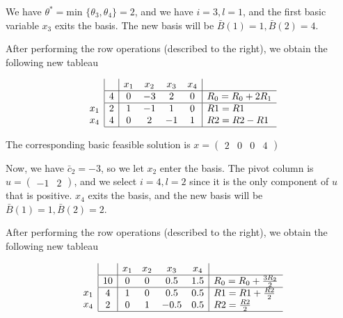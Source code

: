 \documentclass[11pt,a4paper]{article}
\begin{document}
We have $\theta^*=\text{min }\{\theta_3, \theta_4\}=2$, and we have $i=3, l=1$, and the first basic variable $x_3$ exits the basis. The new basis will be $\bar{B}(1)=1, \bar{B}(2)=4$.

After performing the row operations (described to the right), we obtain the following new tableau

$$
\begin{array}{c}
\\
 \\
x_1 \\
x_4 \\ 
\end{array}
\begin{array}{|c|cccc|l}
    & x_1 & x_2 & x_3 & x_4 & \\ \hline
  4 & 0 & -3 & 2 & 0 & R_0=R_0+2R_1 \\  \hline
  2 & 1 & -1 & 1 & 0 & R1=R1\\
  4 & 0 & 2 & -1 & 1 & R2 = R2 - R1\\\hline
\end{array}
$$

The corresponding basic feasible solution is $x=\begin{pmatrix}2 & 0 & 0 & 4\end{pmatrix}$

Now, we have $\bar{c}_2=-3$, so we let $x_2$ enter the basis. The pivot column is $u=\begin{pmatrix}-1 & 2\end{pmatrix}$, and we select $i=4,l=2$ since it is the only component of $u$ that is positive. $x_4$ exits the basis, and the new basis will be $\bar{B}(1)=1, \bar{B}(2)=2$.

After performing the row operations (described to the right), we obtain the following new tableau

$$
\begin{array}{c}
\\
 \\
x_1 \\
x_4 \\ 
\end{array}
\begin{array}{|c|cccc|l}
    & x_1 & x_2 & x_3 & x_4 & \\ \hline
  10& 0 & 0 & 0.5 & 1.5 & R_0=R_0+\frac{3R_2}{2} \\  \hline
  4 & 1 & 0 & 0.5 & 0.5 & R1=R1+\frac{R2}{2}\\
  2 & 0 & 1 & -0.5 & 0.5 & R2 = \frac{R2}{2}\\\hline
\end{array}
$$
\end{document}
